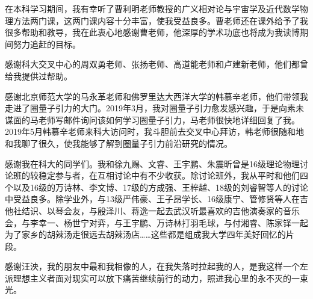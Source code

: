 
\begin{acknowledgements}

	在本科学习期间，我有幸听了曹利明老师教授的广义相对论与宇宙学及近代数学物理方法两门课，这两门课内容十分丰富，使我受益良多。曹老师还在课外给予了我很多帮助和教导，我在此衷心地感谢曹老师，他深厚的学术功底也将成为我读博期间努力追赶的目标。

	感谢科大交叉中心的周双勇老师、张扬老师、高道能老师和卢建新老师，他们都曾给我提供过帮助。

	感谢北京师范大学的马永革老师和佛罗里达大西洋大学的韩慕辛老师，他们带领我走进了圈量子引力的大门。2019年3月，我对圈量子引力愈发感兴趣，于是向素未谋面的马老师写邮件询问该如何学习圈量子引力，马老师很快地详细回复了我。2019年5月韩慕辛老师来科大访问时，我斗胆前去交叉中心拜访，韩老师很随和地和我聊了很久，使我能够了解到圈量子引力前沿研究的情况。

	感谢我在科大的同学们。我和徐九赐、文睿、王宇鹏、朱震昕曾是16级理论物理讨论班的较稳定参与者，在互相讨论中有不少收获。除讨论班外，我从平时和他们四个以及16级的万诗林、李文博、17级的方成强、王梓越、18级的刘睿智等人的讨论中受益良多。除学业外，与13级严伟豪、王子昂学长、16级康宁、管修贤等人在吉他社结识、以琴会友，与殷泽川、蒋逸一起去武汉听最喜欢的吉他演奏家的音乐会，与李幸一、杨世宁对弈，与王宇鹏、万诗林打羽毛球，与付湘睿、陈家铎一起为了家乡的胡辣汤走很远去胡辣汤店……这些都是组成我大学四年美好回忆的片段。

	感谢汪泱，我的朋友中最和我相像的人，在我失落时拉起我的人，是我这样一个左派理想主义者面对现实可以放下痛苦继续前行的动力，照进我心里的永不灭的一束光。

\end{acknowledgements}
